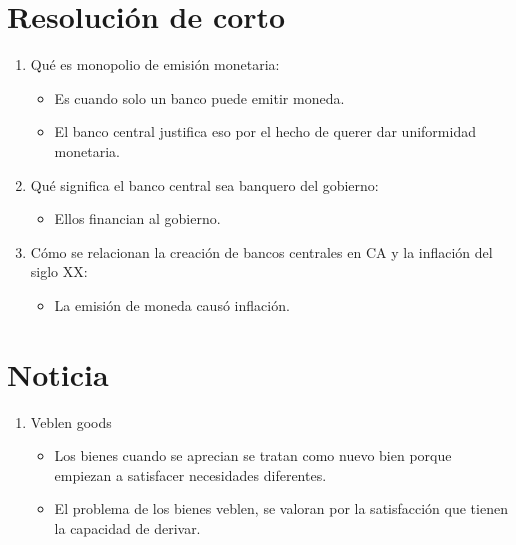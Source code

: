\section{Resolución de corto}
\begin{enumerate}
    \item Qué es monopolio de emisión monetaria:
        \begin{itemize}
            \item Es cuando solo un banco puede emitir moneda.
            \item El banco central justifica eso por el hecho de querer dar uniformidad monetaria.
        \end{itemize}
    \item Qué significa el banco central sea banquero del gobierno:
        \begin{itemize}
            \item Ellos financian al gobierno.
        \end{itemize}
    \item Cómo se relacionan la creación de bancos centrales en CA y la inflación del siglo XX: 
        \begin{itemize}
            \item La emisión de moneda causó inflación.
        \end{itemize}
\end{enumerate}

\section{Noticia}
\begin{enumerate}
    \item Veblen goods
        \begin{itemize}
            \item Los bienes cuando se aprecian se tratan como nuevo bien porque empiezan a satisfacer necesidades diferentes.
            \item El problema de los bienes veblen, se valoran por la satisfacción que tienen la capacidad de derivar.
        \end{itemize}
\end{enumerate}

